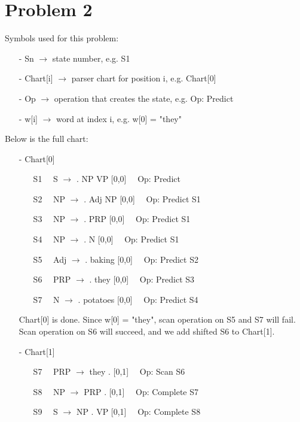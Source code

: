 \documentclass[twoside]{homework}
\begin{document}
\section*{Problem 2}
Symbols used for this problem:
\begin{itemize}
    \item [-] Sn $\xrightarrow{}$ state number, e.g. S1
    \item [-] Chart[i] $\xrightarrow{}$ parser chart for position i, e.g. Chart[0]
    \item [-] Op $\xrightarrow{}$ operation that creates the state, e.g. Op: Predict
    \item [-] w[i] $\xrightarrow{}$ word at index i, e.g. w[0] = "they"
\end{itemize}
Below is the full chart:
\begin{itemize}
    \item [-] Chart[0]
    \begin{itemize}
        \item [S1] $\text{ }$ S $\xrightarrow{}$ . NP VP [0,0] $\text{ }$ Op: Predict
        \item [S2] $\text{ }$ NP $\xrightarrow{}$ . Adj NP [0,0] $\text{ }$ Op: Predict S1
        \item [S3] $\text{ }$ NP $\xrightarrow{}$ . PRP [0,0] $\text{ }$ Op: Predict S1
        \item [S4] $\text{ }$ NP $\xrightarrow{}$ . N [0,0] $\text{ }$ Op: Predict S1
        \item [S5] $\text{ }$ Adj $\xrightarrow{}$ . baking [0,0] $\text{ }$ Op: Predict S2
        \item [S6] $\text{ }$ PRP $\xrightarrow{}$ . they [0,0] $\text{ }$ Op: Predict S3
        \item [S7] $\text{ }$ N $\xrightarrow{}$ . potatoes [0,0] $\text{ }$ Op: Predict S4
    \end{itemize}
    Chart[0] is done. Since w[0] = "they", scan operation on S5 and S7 will fail. Scan operation on S6 will succeed, and we add shifted S6 to Chart[1].
    \item [-] Chart[1]
    \begin{itemize}
        \item [S7] $\text{ }$ PRP $\xrightarrow{}$ they . [0,1] $\text{ }$ Op: Scan S6
        \item [S8] $\text{ }$ NP $\xrightarrow{}$ PRP . [0,1] $\text{ }$ Op: Complete S7
        \item [S9] $\text{ }$ S $\xrightarrow{}$ NP . VP [0,1] $\text{ }$ Op: Complete S8

\end{itemize}
\end{itemize}
\end{document}
